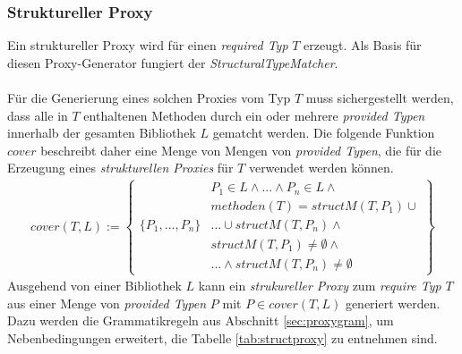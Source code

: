 \documentclass[a4paper,12pt]{article}
\begin{document}
\subsubsection{Struktureller Proxy}
Ein struktureller Proxy wird für einen \emph{required Typ} $T$ erzeugt. Als Basis für diesen Proxy-Generator fungiert der \emph{StructuralTypeMatcher}.\\\\
Für die Generierung eines solchen Proxies vom Typ $T$ muss sichergestellt werden, dass alle in $T$ enthaltenen
Methoden durch ein oder mehrere \emph{provided Typen} innerhalb der gesamten Bibliothek $L$ gematcht werden. Die folgende Funktion $\mathit{cover}$ beschreibt daher eine Menge von Mengen von \emph{provided Typen}, die für die Erzeugung eines \emph{strukturellen Proxies} für $T$ verwendet werden können.
\begin{gather*}
cover(T,L) := 
\left\{\begin{array}{l|l}
					& P_1 \in L \wedge \text{...} \wedge P_n \in L \wedge \\
					& methoden(T) = structM(T,P_1) \cup \\
	\{P_1,...,P_n\}	& \texttt{...} \cup structM(T, P_n) \wedge \\
					& \mathit{structM(T,P_1)} \neq \emptyset \wedge \\
					& \texttt{...}\wedge \mathit{structM(T,P_n)} \neq \emptyset 
\end{array}\right\}
\end{gather*}
Ausgehend von einer Bibliothek $L$ kann ein \emph{strukureller Proxy} zum \emph{require Typ} $T$ aus einer Menge von \emph{provided Typen} $P$ mit $P \in \mathit{cover(T,L)}$ generiert werden. Dazu werden die Grammatikregeln aus Abschnitt \ref{sec:proxygram}, um Nebenbedingungen erweitert, die Tabelle \ref{tab:structproxy} zu entnehmen sind.
\end{document}
